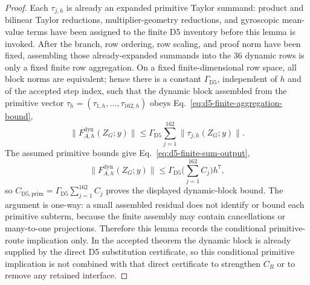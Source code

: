\documentclass[preprint,12pt]{elsarticle}
\begin{document}
\begin{proof}
Each \(\tau_{j,h}\) is already an expanded primitive Taylor summand: product
and bilinear Taylor reductions, multiplier-geometry reductions, and
gyroscopic mean-value terms have been assigned to the finite D5 inventory
before this lemma is invoked.  After the branch, row ordering, row scaling,
and proof norm have been fixed, assembling those already-expanded summands
into the 36 dynamic rows is only a fixed finite row aggregation.  On a fixed
finite-dimensional row space, all block norms are equivalent; hence there is a constant
\(\Gamma_{\mathrm{D5}}\), independent of \(h\) and of the accepted step
index, such that the dynamic block assembled from the primitive vector
\(\tau_h=(\tau_{1,h},\ldots,\tau_{162,h})\) obeys
Eq.~\eqref{eq:d5-finite-aggregation-bound},
\begin{equation}
\label{eq:d5-finite-aggregation-bound}
  \|F^{\mathrm{dyn}}_{A,h}(Z_G;y)\|
  \le \Gamma_{\mathrm{D5}}\sum_{j=1}^{162}\|\tau_{j,h}(Z_G;y)\|.
\end{equation}
The assumed primitive bounds give
Eq.~\eqref{eq:d5-finite-sum-output},
\begin{equation}
\label{eq:d5-finite-sum-output}
  \|F^{\mathrm{dyn}}_{A,h}(Z_G;y)\|
  \le
  \Gamma_{\mathrm{D5}}\Big(\sum_{j=1}^{162}C_j\Big)h^7,
\end{equation}
so \(C_{\mathrm{D5},\mathrm{prim}}
=\Gamma_{\mathrm{D5}}\sum_{j=1}^{162}C_j\) proves the displayed dynamic-block
bound.  The argument is one-way: a small assembled residual does not identify
or bound each primitive subterm, because the finite assembly may contain
cancellations or many-to-one projections.  Therefore this lemma records the
conditional primitive-route implication only.  In the accepted theorem the
dynamic block is already supplied by the direct D5 substitution certificate,
so this conditional primitive implication is not combined with that direct
certificate to strengthen \(C_R\) or to remove any retained interface.
\end{proof}
\end{document}
